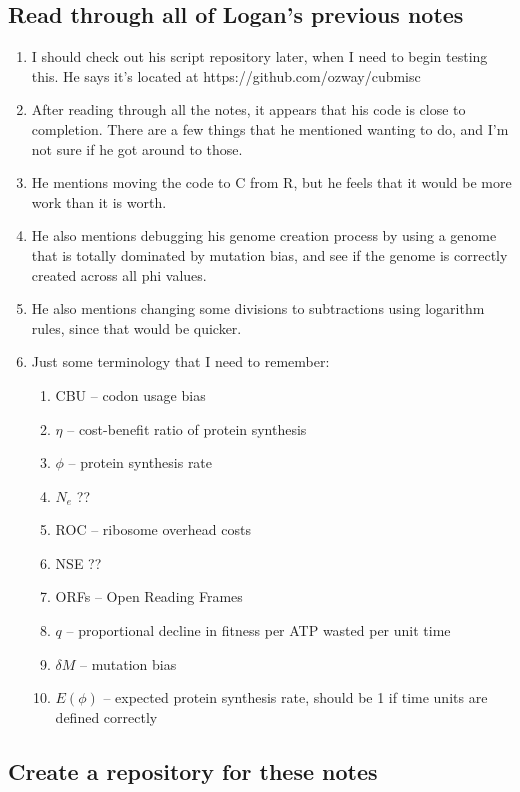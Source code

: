 \documentclass[12 pt]{article}
\begin{document}
	\subsection{Read through all of Logan's previous notes} 
		\begin{enumerate}
			\item I should check out his script repository later, when I need to begin testing this. He says it's located at https://github.com/ozway/cubmisc
			\item After reading through all the notes, it appears that his code is close to completion. There are a few things that he mentioned wanting to do, and I'm not sure if he got around to those.
			\item He mentions moving the code to C from R, but he feels that it would be more work than it is worth.
			\item He also mentions debugging his genome creation process by using a genome that is totally dominated by mutation bias, and see if the genome is correctly created across all phi values.
			\item He also mentions changing some divisions to subtractions using logarithm rules, since that would be quicker.
			
			\item Just some terminology that I need to remember:
			\begin{enumerate}
				\item CBU -- codon usage bias
				\item $ \eta $ -- cost-benefit ratio of protein synthesis
				\item $ \phi $ -- protein synthesis rate
				\item $ N_e $ ??
				\item ROC -- ribosome overhead costs
				\item NSE ??
				\item ORFs -- Open Reading Frames
				\item $ q $ -- proportional decline in fitness per ATP wasted per unit time
				\item $ \delta M $ -- mutation bias
				\item $ E(\phi) $ -- expected protein synthesis rate, should be 1 if time units are defined correctly
				
			\end{enumerate} 
		\end{enumerate}
		
		\subsection{Create a repository for these notes}
\end{document}
